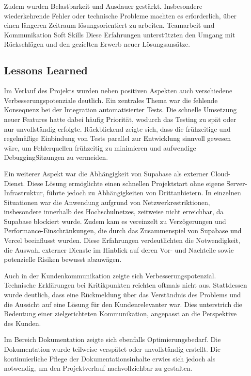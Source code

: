 \documentclass[a4paper,12pt]{article}
\begin{document}
Zudem wurden Belastbarkeit und Ausdauer gestärkt. Insbesondere wiederkehrende Fehler oder technische Probleme machten es erforderlich, über einen längeren Zeitraum lösungsorientiert zu arbeiten. Teamarbeit und Kommunikation Soft Skills Diese Erfahrungen unterstützten den Umgang mit Rückschlägen und den gezielten Erwerb neuer Lösungsansätze.


\subsection{Lessons Learned}

Im Verlauf des Projekts wurden neben positiven Aspekten auch verschiedene Verbesserungspotenziale deutlich. Ein zentrales Thema war die fehlende Konsequenz bei der Integration automatisierter Tests. Die schnelle Umsetzung neuer Features hatte dabei häufig Priorität, wodurch das Testing zu spät oder nur unvollständig erfolgte. Rückblickend zeigte sich, dass die frühzeitige und regelmäßige Einbindung von Tests parallel zur Entwicklung sinnvoll gewesen wäre, um Fehlerquellen frühzeitig zu minimieren und aufwendige DebuggingSitzungen zu vermeiden.

Ein weiterer Aspekt war die Abhängigkeit von Supabase als externer Cloud-Dienst. Diese Lösung ermöglichte einen schnellen Projektstart ohne eigene Server-Infrastruktur, führte jedoch zu Abhängigkeiten von Drittanbietern. In einzelnen Situationen war die Anwendung aufgrund von Netzwerkrestriktionen, insbesondere innerhalb des Hochschulnetzes, zeitweise nicht erreichbar, da Supabase blockiert wurde. Zudem kam es vereinzelt zu Verzögerungen und Performance-Einschränkungen, die durch das Zusammenspiel von Supabase und Vercel beeinflusst wurden. Diese Erfahrungen verdeutlichten die Notwendigkeit, die Auswahl externer Dienste im Hinblick auf deren Vor- und Nachteile sowie potenzielle Risiken bewusst abzuwägen.

Auch in der Kundenkommunikation zeigte sich Verbesserungspotenzial. Technische Erklärungen bei Kritikpunkten reichten oftmals nicht aus. Stattdessen wurde deutlich, dass eine Rückmeldung über das Verständnis des Problems und die Aussicht auf eine Lösung für den Kundenrelevanter war. Dies unterstrich die Bedeutung einer zielgerichteten Kommunikation, angepasst an die Perspektive des Kunden.

Im Bereich Dokumentation zeigte sich ebenfalls Optimierungsbedarf. Die Dokumentation wurde teilweise verspätet oder unvollständig erstellt. Die kontinuierliche Pflege der Dokumentationsinhalte erwies sich jedoch als notwendig, um den Projektverlauf nachvollziehbar zu gestalten.
\end{document}
